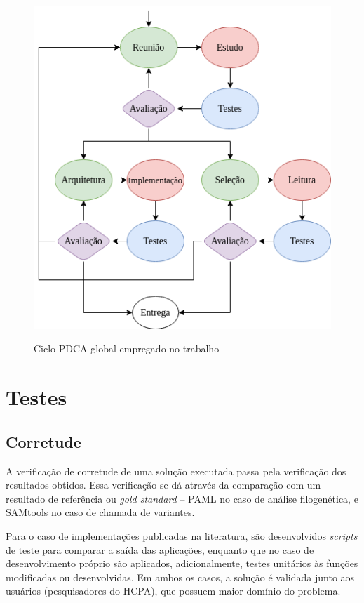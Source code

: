 \documentclass[cic,tc]{iiufrgs}
\begin{document}
\begin{figure} \caption{Ciclo PDCA global empregado no trabalho} \begin{center}
\includegraphics[width=0.75\linewidth]{img/pdca_global.png} \end{center}
 \label{fig:pdca_global} \end{figure}

\section{Testes}
\label{sec:test}

\subsection{Corretude}

A verificação de corretude de uma solução executada passa pela verificação dos
resultados obtidos. Essa verificação se dá através da comparação com um
resultado de referência ou \textit{gold standard} -- PAML no caso de análise
filogenética, e SAMtools no caso de chamada de variantes.

Para o caso de implementações publicadas na literatura, são desenvolvidos
\textit{scripts} de teste para comparar a saída das aplicações, enquanto que no
caso de desenvolvimento próprio são aplicados, adicionalmente, testes unitários
às funções modificadas ou desenvolvidas. Em ambos os casos, a solução é
validada junto aos usuários (pesquisadores do HCPA), que possuem maior domínio
do problema.
\end{document}
